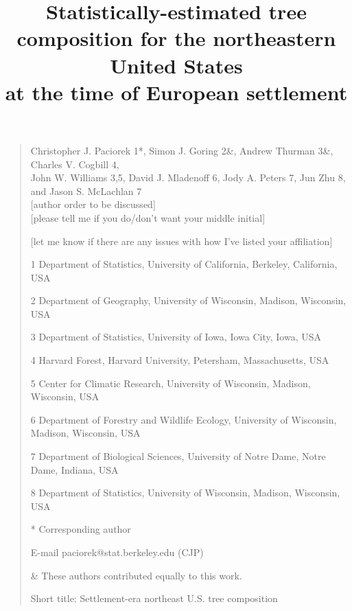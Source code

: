 \documentclass[12pt]{article}\usepackage[]{graphicx}\usepackage[]{color}
\begin{document}
\title{Statistically-estimated tree composition for the northeastern United
States \\
at the time of European settlement}
\maketitle
\begin{quote}
Christopher J. Paciorek 1{*}, Simon J. Goring 2\&, Andrew Thurman
3\&, Charles V. Cogbill 4, \\
John W. Williams 3,5, David J. Mladenoff 6, Jody A. Peters 7, Jun
Zhu 8, \\
and Jason S. McLachlan 7 \\
{[}author order to be discussed{]}\\
{[}please tell me if you do/don't want your middle initial{]}

{[}let me know if there are any issues with how I've listed your affiliation{]}

1 Department of Statistics, University of California, Berkeley, California,
USA

2 Department of Geography, University of Wisconsin, Madison, Wisconsin,
USA

3 Department of Statistics, University of Iowa, Iowa City, Iowa, USA

4 Harvard Forest, Harvard University, Petersham, Massachusetts, USA

5 Center for Climatic Research, University of Wisconsin, Madison,
Wisconsin, USA

6 Department of Forestry and Wildlife Ecology, University of Wisconsin,
Madison, Wisconsin, USA

7 Department of Biological Sciences, University of Notre Dame, Notre
Dame, Indiana, USA

8 Department of Statistics, University of Wisconsin, Madison, Wisconsin,
USA

{*} Corresponding author

E-mail paciorek@stat.berkeley.edu (CJP)

\& These authors contributed equally to this work. 

Short title: Settlement-era northeast U.S. tree composition
\end{quote}
\end{document}
